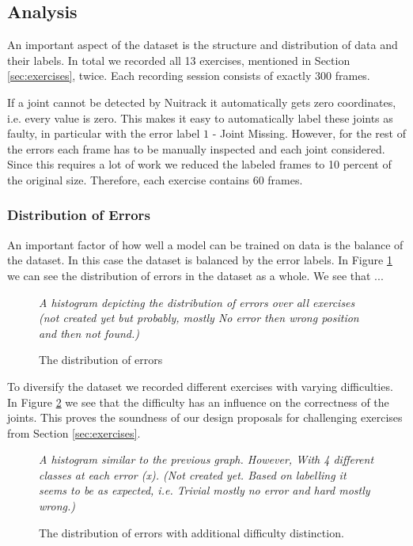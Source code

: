 \subsection{Analysis}

An important aspect of the dataset is the structure and distribution of data and their labels. In total we recorded all 13 exercises, mentioned in Section \ref{sec:exercises}, twice. Each recording session consists of exactly 300 frames.

If a joint cannot be detected by Nuitrack it automatically gets zero coordinates, i.e. every value is zero. This makes it easy to automatically label these joints as faulty, in particular with the error label $1$ - Joint Missing. However, for the rest of the errors each frame has to be manually inspected and each joint considered. Since this requires a lot of work we reduced the labeled frames to 10 percent of the original size. Therefore, each exercise contains 60 frames. 

\subsubsection{Distribution of Errors}

An important factor of how well a model can be trained on data is the balance of the dataset. In this case the dataset is balanced by the error labels. In Figure \ref{fig:statistics_err} we can see the distribution of errors in the dataset as a whole. We see that ...

\begin{figure}
  \centering
  \textit{A histogram depicting the distribution of errors over all exercises (not created yet but probably, mostly No error then wrong position and then not found.)}
  \caption[Error Distribution]{The distribution of errors}
  \label{fig:statistics_err}
\end{figure}

To diversify the dataset we recorded different exercises with varying difficulties. In Figure \ref{fig:statistics_err_diff} we see that the difficulty has an influence on the correctness of the joints. This proves the soundness of our design proposals for challenging exercises from Section \ref{sec:exercises}.

\begin{figure}
  \centering
  \textit{A histogram similar to the previous graph. However, With 4 different classes at each error (x). (Not created yet. Based on labelling it seems to be as expected, i.e. Trivial mostly no error and hard mostly wrong.)}
  \caption[Error Distribution with Difficulty]{The distribution of errors with additional difficulty distinction.}
  \label{fig:statistics_err_diff}
\end{figure}
